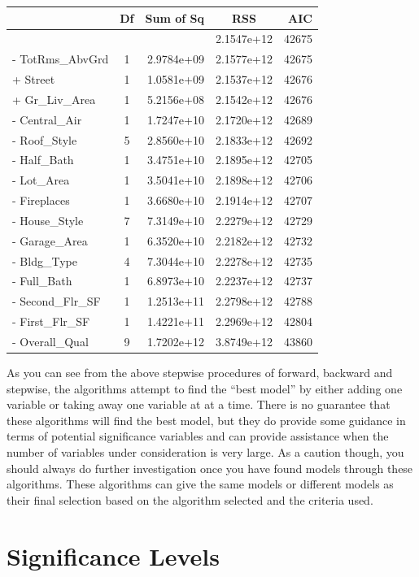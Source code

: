 \documentclass[
  letterpaper,
  DIV=11,
  numbers=noendperiod]{scrreprt}
\begin{document}
\begin{longtable}[]{@{}lcrcr@{}}
\toprule()
& Df & Sum of Sq & RSS & AIC \\
\midrule()
\endhead
& & & 2.1547e+12 & 42675 \\
- TotRms\_AbvGrd & 1 & 2.9784e+09 & 2.1577e+12 & 42675 \\
+ Street & 1 & 1.0581e+09 & 2.1537e+12 & 42676 \\
+ Gr\_Liv\_Area & 1 & 5.2156e+08 & 2.1542e+12 & 42676 \\
- Central\_Air & 1 & 1.7247e+10 & 2.1720e+12 & 42689 \\
- Roof\_Style & 5 & 2.8560e+10 & 2.1833e+12 & 42692 \\
- Half\_Bath & 1 & 3.4751e+10 & 2.1895e+12 & 42705 \\
- Lot\_Area & 1 & 3.5041e+10 & 2.1898e+12 & 42706 \\
- Fireplaces & 1 & 3.6680e+10 & 2.1914e+12 & 42707 \\
- House\_Style & 7 & 7.3149e+10 & 2.2279e+12 & 42729 \\
- Garage\_Area & 1 & 6.3520e+10 & 2.2182e+12 & 42732 \\
- Bldg\_Type & 4 & 7.3044e+10 & 2.2278e+12 & 42735 \\
- Full\_Bath & 1 & 6.8973e+10 & 2.2237e+12 & 42737 \\
- Second\_Flr\_SF & 1 & 1.2513e+11 & 2.2798e+12 & 42788 \\
- First\_Flr\_SF & 1 & 1.4221e+11 & 2.2969e+12 & 42804 \\
- Overall\_Qual & 9 & 1.7202e+12 & 3.8749e+12 & 43860 \\
\bottomrule()
\end{longtable}

As you can see from the above stepwise procedures of forward, backward
and stepwise, the algorithms attempt to find the ``best model'' by
either adding one variable or taking away one variable at at a time.
There is no guarantee that these algorithms will find the best model,
but they do provide some guidance in terms of potential significance
variables and can provide assistance when the number of variables under
consideration is very large. As a caution though, you should always do
further investigation once you have found models through these
algorithms. These algorithms can give the same models or different
models as their final selection based on the algorithm selected and the
criteria used.

\hypertarget{significance-levels}{%
\section{Significance Levels}\label{significance-levels}}
\end{document}
